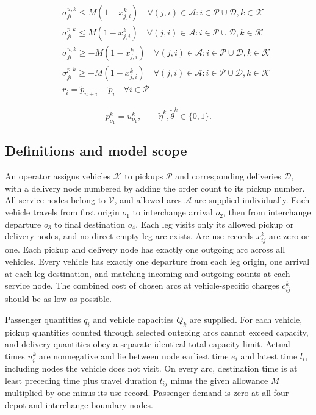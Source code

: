 \documentclass[10pt]{article}
\begin{document}
\begin{align*}
& \quad \sigma_{j i}^{u,k} \le M(1 - x_{j, i}^k) \quad \forall (j, i) \in \mathcal{A}: i \in \mathcal{P} \cup \mathcal{D}, k \in \mathcal{K} \\
& \quad \sigma_{j i}^{p,k} \le M(1 - x_{j, i}^k) \quad \forall (j, i) \in \mathcal{A}: i \in \mathcal{P} \cup \mathcal{D}, k \in \mathcal{K} \\
& \quad \sigma_{j i}^{u,k} \ge -M(1 - x_{j, i}^k) \quad \forall (j, i) \in \mathcal{A}: i \in \mathcal{P} \cup \mathcal{D}, k \in \mathcal{K} \\
& \quad \sigma_{j i}^{p,k} \ge -M(1 - x_{j, i}^k) \quad \forall (j, i) \in \mathcal{A}: i \in \mathcal{P} \cup \mathcal{D}, k \in \mathcal{K} \\
& \quad r_i = \tilde{p}_{n+i} - \tilde{p}_i \quad \forall i \in \mathcal{P}
\end{align*}

\[
p_{o_1}^k=u_{o_1}^k,\qquad\tilde\eta^k,\tilde\theta^k\in\{0,1\}.
\]

\subsection*{Definitions and model scope}
An operator assigns vehicles $\mathcal K$ to pickups $\mathcal P$ and corresponding deliveries $\mathcal D$, with a delivery node numbered by adding the order count to its pickup number. All service nodes belong to $\mathcal V$, and allowed arcs $\mathcal A$ are supplied individually. Each vehicle travels from first origin $o_1$ to interchange arrival $o_2$, then from interchange departure $o_3$ to final destination $o_4$. Each leg visits only its allowed pickup or delivery nodes, and no direct empty-leg arc exists. Arc-use records $x_{ij}^k$ are zero or one. Each pickup and delivery node has exactly one outgoing arc across all vehicles. Every vehicle has exactly one departure from each leg origin, one arrival at each leg destination, and matching incoming and outgoing counts at each service node. The combined cost of chosen arcs at vehicle-specific charges $c_{ij}^k$ should be as low as possible.

Passenger quantities $q_i$ and vehicle capacities $Q_k$ are supplied. For each vehicle, pickup quantities counted through selected outgoing arcs cannot exceed capacity, and delivery quantities obey a separate identical total-capacity limit. Actual times $u_i^k$ are nonnegative and lie between node earliest time $e_i$ and latest time $l_i$, including nodes the vehicle does not visit. On every arc, destination time is at least preceding time plus travel duration $t_{ij}$ minus the given allowance $M$ multiplied by one minus its use record. Passenger demand is zero at all four depot and interchange boundary nodes.
\end{document}
